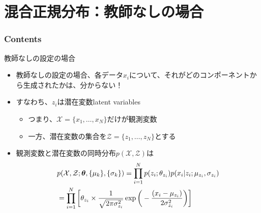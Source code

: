 \documentclass[aspectratio=169,unicode,dvipdfmx,14pt]{beamer}
\begin{document}
\section{混合正規分布：教師なしの場合}

\begin{frame}\frametitle{Contents}
\Large \tableofcontents[currentsection]
\end{frame}


\begin{frame}{教師なしの設定の場合}
\vspace{-.05in}
\begin{itemize}
\item 教師なしの設定の場合、各データ$x_i$について、それがどのコンポーネントから生成されたかは、分からない！
\item すなわち、$z_i$は潜在変数latent variables
\begin{itemize}
\item つまり、$\mathcal{X} = \{ x_1, \ldots, x_N \}$だけが観測変数
\item 一方、潜在変数の集合を$\mathcal{Z} = \{ z_1, \ldots, z_N \}$とする
\end{itemize}
\item 観測変数と潜在変数の同時分布$p(\mathcal{X}, \mathcal{Z})$は
\vspace{-.13in}
\begin{align}
& p(\mathcal{X}, \mathcal{Z};\bm{\theta},\{ \mu_k \}, \{ \sigma_k \})
= \prod_{i=1}^N p(z_i ; \theta_{z_i}) p(x_i | z_i ; \mu_{z_i}, \sigma_{z_i})
\notag \\ &
= \prod_{i=1}^N \bigg[ \theta_{z_i} \times \frac{1}{\sqrt{2\pi\sigma_{z_i}^2}}\exp\bigg( - \frac{(x_i - \mu_{z_i})}{2\sigma_{z_i}^2} \bigg) \bigg]
\end{align}
\end{itemize}
\end{frame}
\end{document}
